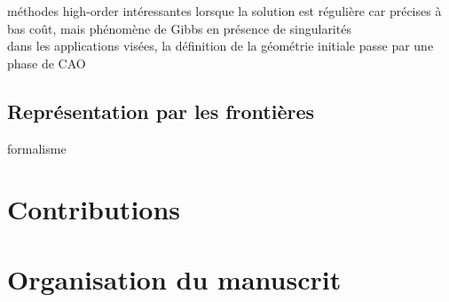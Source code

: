 méthodes high-order intéressantes lorsque la solution est régulière car précises à bas coût, mais phénomène de Gibbs en présence de singularités \cite{bruno2007}\\

dans les applications visées, la définition de la géométrie initiale passe par une phase de CAO


\subsection*{Représentation par les frontières}
formalisme \brep


\section*{Contributions}%


\section*{Organisation du manuscrit}